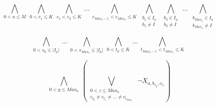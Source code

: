 \documentclass[11pt]{article}
\begin{document}
$$\bigwedge\limits_{0<a\le M}\ \bigwedge\limits_{0<c_1\le K}\ \bigwedge\limits_{c_1<c_2\le K}\ \ldots\ \bigwedge\limits_{c_{{Max_a}-1}<c_{Max_a}\le K}\ \bigwedge\limits_{\substack{b_1 \in I_a \\ b_1 \ne I}}\ \bigwedge\limits_{\substack{b_2 \in I_a \\ b_2 \ne I}}\ \ldots\  \bigwedge\limits_{\substack{b_{Max_a} \in I_a \\ b_{Max_a} \ne I}} $$

$$\bigwedge\limits_{0<s_0\le |I_a|}\  \ldots\  \bigwedge\limits_{0<s_{Max_a}\le |I_a|}\ \bigwedge\limits_{0<t_{0}\le K}\  \ldots\  \bigwedge\limits_{t_{Max_a-1}<t_{Max_a}\le K}\ $$

$$ \bigwedge\limits_{0<y\le Max_a}\  \left( \bigvee\limits_{\substack{0<z\le Max_a \\ c_{t_{0}}\ne c_{t_{1}}\ne \ldots \ne c_{t_{Max_a}}}}\  \neg X_{a,b_{s_{y}},c_{t_{z}}}\right)$$
\end{document}
